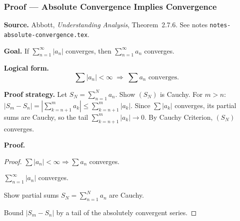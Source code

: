 
\clearpage
{}
\hypertarget{proof-RA-ABB-P-abs-conv}{}

\subsubsection[Absolute Convergence Implies Convergence]{Proof --- Absolute Convergence Implies Convergence}

\bigskip

\noindent
\textbf{Source.}
Abbott, \emph{Understanding Analysis}, Theorem~2.7.6.
See notes \texttt{notes-absolute-convergence.tex}.

\vspace{0.75em}

\noindent
\textbf{Goal.}
If $\sum_{n=1}^\infty |a_n|$ converges, then $\sum_{n=1}^\infty a_n$
converges.

\vspace{0.75em}

\noindent
\textbf{Logical form.}
\[
  \sum |a_n| < \infty
  \;\Rightarrow\;
  \sum a_n \text{ converges.}
\]

\vspace{0.75em}

\noindent
\textbf{Proof strategy.}
Let $S_N = \sum_{n=1}^N a_n$. Show $(S_N)$ is Cauchy.
For $m > n$: $|S_m - S_n| = |\sum_{k=n+1}^m a_k| \le \sum_{k=n+1}^m |a_k|$.
Since $\sum |a_k|$ converges, its partial sums are Cauchy, so the tail
$\sum_{k=n+1}^m |a_k| \to 0$. By Cauchy Criterion, $(S_N)$ converges.

\vspace{0.75em}

\noindent
\textbf{Proof.}
\begin{proof}
\Claim $\sum |a_n| < \infty \Rightarrow \sum a_n$ converges.

\Given $\sum_{n=1}^\infty |a_n|$ converges.

\Goal Show partial sums $S_N = \sum_{n=1}^N a_n$ are Cauchy.

\Strategy Bound $|S_m - S_n|$ by a tail of the absolutely convergent series.

\medskip





\end{proof}

